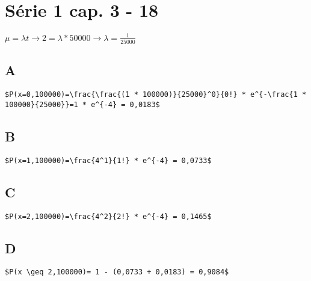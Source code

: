 \section*{Série 1 cap. 3 - 18}
$\mu = \lambda t \rightarrow 2 = \lambda * 50000 \rightarrow \lambda = \frac{1}{25000}$
\subsection*{A}
\begin{lstlisting}[mathescape]
$P(x=0,100000)=\frac{\frac{(1 * 100000)}{25000}^0}{0!} * e^{-\frac{1 * 100000}{25000}}=1 * e^{-4} = 0,0183$
\end{lstlisting}

\subsection*{B}
\begin{lstlisting}[mathescape]
$P(x=1,100000)=\frac{4^1}{1!} * e^{-4} = 0,0733$
\end{lstlisting}

\subsection*{C}
\begin{lstlisting}[mathescape]
$P(x=2,100000)=\frac{4^2}{2!} * e^{-4} = 0,1465$
\end{lstlisting}

\subsection*{D}
\begin{lstlisting}[mathescape]
$P(x \geq 2,100000)= 1 - (0,0733 + 0,0183) = 0,9084$
\end{lstlisting}
